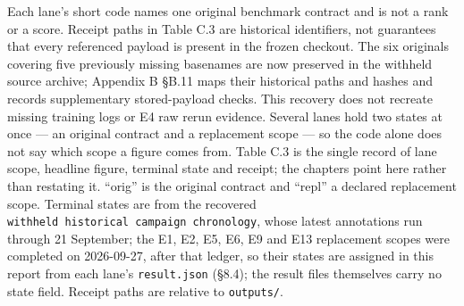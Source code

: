 \documentclass[12pt,a4paper]{report}
\begin{document}
Each lane's short code names one original benchmark contract and is not
a rank or a score. Receipt paths in Table C.3 are historical
identifiers, not guarantees that every referenced payload is present in
the frozen checkout. The six originals covering five previously missing
basenames are now preserved in the withheld source archive; Appendix B
§B.11 maps their historical paths and hashes and records supplementary
stored-payload checks. This recovery does not recreate missing training
logs or E4 raw rerun evidence. Several lanes hold two states at once ---
an original contract and a replacement scope --- so the code alone does
not say which scope a figure comes from. Table C.3 is the single record
of lane scope, headline figure, terminal state and receipt; the chapters
point here rather than restating it. ``orig'' is the original contract
and ``repl'' a declared replacement scope. Terminal states are from the
recovered \texttt{withheld\ historical\ campaign\ chronology}, whose
latest annotations run through 21 September; the E1, E2, E5, E6, E9 and
E13 replacement scopes were completed on 2026-09-27, after that ledger,
so their states are assigned in this report from each lane's
\texttt{result.json} (§8.4); the result files themselves carry no state
field. Receipt paths are relative to \texttt{outputs/}.
\end{document}
